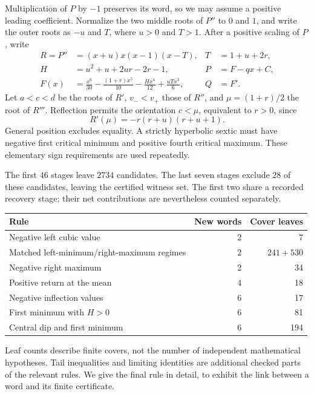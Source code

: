 \documentclass[11pt]{article}
\theoremstyle{definition}
\begin{document}
Multiplication of $P$ by $-1$ preserves its word, so we may assume a
positive leading coefficient. Normalize the two middle roots of $P''$ to
$0$ and $1$, and write the outer roots as $-u$ and $T$, where $u>0$ and
$T>1$. After a positive scaling of $P$, write
\begin{align}
 R=P''&=(x+u)x(x-1)(x-T), &T&=1+u+2r,\\
 H&=u^2+u+2ur-2r-1, &P&=F-qx+C,\\
 F(x)&=\frac{x^6}{30}-\frac{(1+r)x^5}{10}
       -\frac{Hx^4}{12}+\frac{uTx^3}{6}, &Q&=F'.
\end{align}
Let $a<c<d$ be the roots of $R'$, $v_-<v_+$ those of $R''$, and
$\mu=(1+r)/2$ the root of $R'''$. Reflection permits the orientation
$c<\mu$, equivalent to $r>0$, since
\begin{equation}
 R'(\mu)=-r(r+u)(r+u+1).
\end{equation}
General position excludes equality. A strictly hyperbolic sextic must
have negative first critical minimum and positive fourth critical
maximum. These elementary sign requirements are used repeatedly.

The first $46$ stages leave $2734$ candidates. The last seven stages
exclude $28$ of these candidates, leaving the certified witness set.
The first two share a recorded recovery stage; their
net contributions are nevertheless counted separately.
\begin{center}\small
\begin{tabular}{p{.55\linewidth}rr}
\toprule
Rule&New words&Cover leaves\\
\midrule
Negative left cubic value&2&7\\
Matched left-minimum/right-maximum regimes&2&$241+530$\\
Negative right maximum&2&34\\
Positive return at the mean&4&18\\
Negative inflection values&6&17\\
First minimum with $H>0$&6&81\\
Central dip and first minimum&6&194\\
\bottomrule
\end{tabular}
\end{center}
Leaf counts describe finite covers, not the number of independent
mathematical hypotheses. Tail inequalities and limiting identities are
additional checked parts of the relevant rules. We give the final rule
in detail, to exhibit the link between a word and its finite certificate.
\end{document}
